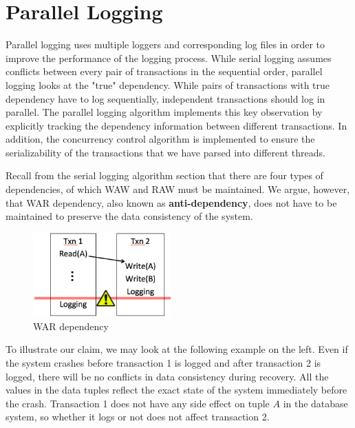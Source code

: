\section{Parallel Logging}
Parallel logging uses multiple loggers and corresponding log files in order to improve the performance of the logging process. While serial logging assumes conflicts between every pair of transactions in the sequential order, parallel logging looks at the "true" dependency. While pairs of transactions with true dependency have to log sequentially, independent transactions should log in parallel. The parallel logging algorithm implements this key observation by explicitly tracking the dependency information between different transactions. In addition, the concurrency control algorithm is implemented to ensure the serializability of the transactions that we have parsed into different threads. \par


Recall from the serial logging algorithm section that there are four types of dependencies, of which WAW and RAW must be maintained. We argue, however, that WAR dependency, also known as  \textbf{anti-dependency}, does not have to be maintained to preserve the data consistency of the system.\\
\begin{figure}
  \begin{center}
    \includegraphics[width=150pt]{WAR.jpg}
  \end{center}
  \caption{WAR dependency}
\end{figure} 
To illustrate our claim, we may look at the following example on the left. Even if the system crashes before transaction 1 is logged and after transaction 2 is logged, there will be no conflicts in data consistency during recovery. All the values in the data tuples reflect the exact state of the system immediately before the crash. Transaction 1 does not have any side effect on tuple $A$ in the database system, so whether it logs or not does not affect transaction 2.\par


